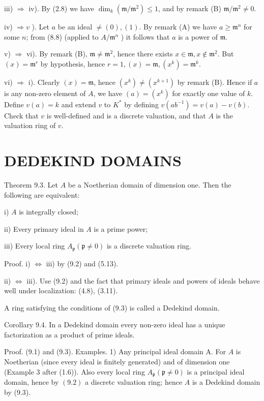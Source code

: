 \documentclass{standalone}
\theoremstyle{definition}
\theoremstyle{remark}
\begin{document}
iii) $\Rightarrow$ iv). By (2.8) we have $\operatorname{dim}_{k}\left(\mathfrak{m} / \mathfrak{m}^{2}\right) \leqslant 1$, and by remark (B) $\mathfrak{m} / \mathfrak{m}^{2} \neq 0$.

iv) $\Rightarrow v$ ). Let $a$ be an ideal $\neq(0),(1)$. By remark (A) we have $a \geq \mathfrak{m}^{n}$ for some $n$; from (8.8) (applied to $A / \mathfrak{m}^{n}$ ) it follows that $a$ is a power of $\mathfrak{m}$.

v) $\Rightarrow$ vi). By remark (B), $\mathfrak{m} \neq \mathfrak{m}^{2}$, hence there exists $x \in \mathfrak{m}, x \notin \mathfrak{m}^{2}$. But $(x)=\mathfrak{m}^{r}$ by hypothesis, hence $r=1,(x)=\mathfrak{m},\left(x^{k}\right)=\mathfrak{m}^{k}$.

vi) $\Rightarrow$ i). Clearly $(x)=\mathfrak{m}$, hence $\left(x^{k}\right) \neq\left(x^{k+1}\right)$ by remark (B). Hence if $a$ is any non-zero element of $A$, we have $(a)=\left(x^{k}\right)$ for exactly one value of $k$. Define $v(a)=k$ and extend $v$ to $K^{*}$ by defining $v\left(a b^{-1}\right)=v(a)-v(b)$. Check that $v$ is well-defined and is a discrete valuation, and that $A$ is the valuation ring of $v$.

\section{DEDEKIND DOMAINS}
Theorem 9.3. Let $A$ be a Noetherian domain of dimension one. Then the following are equivalent:

i) $A$ is integrally closed;

ii) Every primary ideal in $A$ is a prime power;

iii) Every local ring $A_{\mathfrak{p}}(\mathfrak{p} \neq 0)$ is a discrete valuation ring.

Proof. i) $\Leftrightarrow$ iii) by (9.2) and (5.13).

ii) $\Leftrightarrow$ iii). Use (9.2) and the fact that primary ideals and powers of ideals behave well under localization: (4.8), (3.11).

A ring satisfying the conditions of (9.3) is called a Dedekind domain.

Corollary 9.4. In a Dedekind domain every non-zero ideal has a unique factorization as a product of prime ideals.

Proof. (9.1) and (9.3). Examples. 1) Any principal ideal domain A. For $A$ is Noetherian (since every ideal is finitely generated) and of dimension one (Example 3 after (1.6)). Also every local ring $A_{\mathfrak{p}}(\mathfrak{p} \neq 0)$ is a principal ideal domain, hence by $(9.2)$ a discretc valuation ring; hence $A$ is a Dedekind domain by (9.3).
\end{document}
